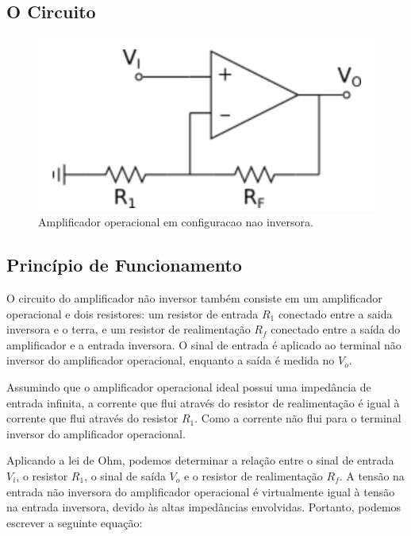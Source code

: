 \documentclass[12pt,twoside, a4paper, twocolumn]{article}
\begin{document}
\subsection{O Circuito}

\begin{figure}[h]
    \centering
    \includegraphics[width=1\columnwidth]{images/opamp_naoinversor.png}
    \caption{Amplificador operacional em configuracao nao inversora.}
\end{figure}

\subsection{Princípio de Funcionamento}

O circuito do amplificador não inversor também consiste em um amplificador operacional e dois resistores: um resistor de entrada $R_1$ conectado entre a saida inversora e o terra, e um resistor de realimentação $R_f$ conectado entre a saída do amplificador e a entrada inversora. O sinal de entrada é aplicado ao terminal não inversor do amplificador operacional, enquanto a saída é medida no $V_o$.

Assumindo que o amplificador operacional ideal possui uma impedância de entrada infinita, a corrente que flui através do resistor de realimentação é igual à corrente que flui através do resistor $R_1$. Como a corrente não flui para o terminal inversor do amplificador operacional.

Aplicando a lei de Ohm, podemos determinar a relação entre o sinal de entrada $V_i$, o resistor $R_1$, o sinal de saída $V_o$ e o resistor de realimentação $R_f$. A tensão na entrada não inversora do amplificador operacional é virtualmente igual à tensão na entrada inversora, devido às altas impedâncias envolvidas. Portanto, podemos escrever a seguinte equação:
\end{document}
